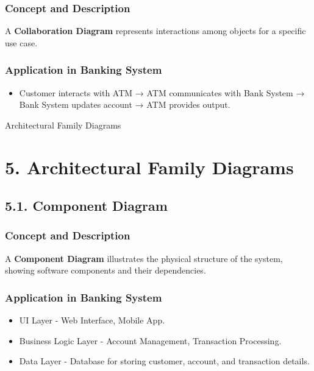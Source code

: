 \subsubsection{Concept and Description}\label{concept-and-description-6}

A \textbf{Collaboration Diagram} represents interactions among objects
for a specific use case.

\subsubsection{Application in Banking
System}\label{application-in-banking-system-6}

\begin{itemize}
\item
  Customer interacts with ATM → ATM communicates with Bank System → Bank
  System updates account → ATM provides output.
\end{itemize}

Architectural Family Diagrams

\section{5. Architectural Family
Diagrams}\label{architectural-family-diagrams}

\subsection{5.1. Component Diagram}\label{component-diagram}

\subsubsection{Concept and Description}\label{concept-and-description-7}

A \textbf{Component Diagram} illustrates the physical structure of the
system, showing software components and their dependencies.

\subsubsection{Application in Banking
System}\label{application-in-banking-system-7}

\begin{itemize}
\item
  UI Layer - Web Interface, Mobile App.
\item
  Business Logic Layer - Account Management, Transaction Processing.
\item
  Data Layer - Database for storing customer, account, and transaction
  details.
\end{itemize}

